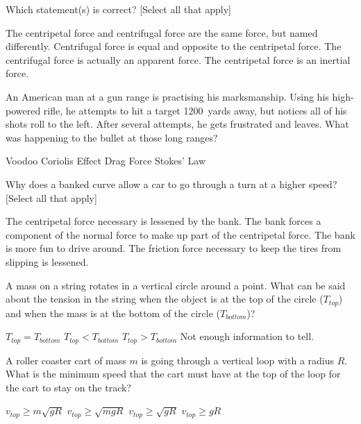 \question Which statement(s) is correct? [Select all that apply]
\begin{checkboxes}
\choice The centripetal force and centrifugal force are the same force, but named differently.
\CorrectChoice Centrifugal force is equal and opposite to the centripetal force. \correct
\CorrectChoice The centrifugal force is actually an apparent force. \correct
\choice The centripetal force is an inertial force.
\end{checkboxes}

\question An American man at a gun range is practising his marksmanship. Using his high-powered rifle, he attempts to hit a target \SI{1200}{yards} away, but notices all of his shots roll to the left. After several attempts, he gets frustrated and leaves. What was happening to the bullet at those long ranges?
\begin{checkboxes}
\choice Voodoo
\CorrectChoice Coriolis Effect \correct
\choice Drag Force
\choice Stokes' Law
\end{checkboxes}


\question Why does a banked curve allow a car to go through a turn at a higher speed? [Select all that apply]
\begin{checkboxes}
\choice The centripetal force necessary is lessened by the bank.
\CorrectChoice The bank forces a component of the normal force to make up part of the centripetal force. \correct
\choice The bank is more fun to drive around.
\CorrectChoice The friction force necessary to keep the tires from slipping is lessened. \correct
\end{checkboxes}

\question A mass on a string rotates in a vertical circle around a point.  What can be said about the tension in the string when the object is at the top of the circle ($T_{top}$) and when the mass is at the bottom of the circle ($T_{bottom}$)?
\begin{checkboxes}
\choice $T_{top}=T_{bottom}$
\CorrectChoice $T_{top}<T_{bottom}$
\choice $T_{top}>T_{bottom}$
\choice Not enough information to tell.
\end{checkboxes}

\question A roller coaster cart of mass $m$ is going through a vertical loop with a radius $R$. What is the minimum speed that the cart must have at the top of the loop for the cart to stay on the track?
\begin{checkboxes}
\choice $v_{top}\geq m\sqrt{gR}$
\choice   $v_{top}\geq\sqrt{mgR}$
\CorrectChoice  $v_{top}\geq\sqrt{gR}$
\choice  $v_{top}\geq gR$
\end{checkboxes}


